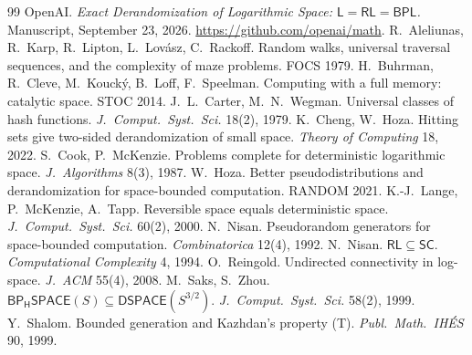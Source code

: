\documentclass[11pt]{article}
\theoremstyle{definition}
\theoremstyle{remark}
\begin{document}
\begin{thebibliography}{99}\small
{} OpenAI. \emph{Exact Derandomization of Logarithmic Space: $\mathsf L=\mathsf{RL}=\mathsf{BPL}$.} Manuscript, September 23, 2026. \url{https://github.com/openai/math}.
 R.~Aleliunas, R.~Karp, R.~Lipton, L.~Lov\'asz, C.~Rackoff. Random walks, universal traversal sequences, and the complexity of maze problems. FOCS 1979.
 H.~Buhrman, R.~Cleve, M.~Kouck\'y, B.~Loff, F.~Speelman. Computing with a full memory: catalytic space. STOC 2014.
 J.~L.~Carter, M.~N.~Wegman. Universal classes of hash functions. \emph{J.\ Comput.\ Syst.\ Sci.} 18(2), 1979.
 K.~Cheng, W.~Hoza. Hitting sets give two-sided derandomization of small space. \emph{Theory of Computing} 18, 2022.
 S.~Cook, P.~McKenzie. Problems complete for deterministic logarithmic space. \emph{J.\ Algorithms} 8(3), 1987.
 W.~Hoza. Better pseudodistributions and derandomization for space-bounded computation. RANDOM 2021.
 K.-J.~Lange, P.~McKenzie, A.~Tapp. Reversible space equals deterministic space. \emph{J.\ Comput.\ Syst.\ Sci.} 60(2), 2000.
 N.~Nisan. Pseudorandom generators for space-bounded computation. \emph{Combinatorica} 12(4), 1992.
 N.~Nisan. $\mathsf{RL}\subseteq\mathsf{SC}$. \emph{Computational Complexity} 4, 1994.
 O.~Reingold. Undirected connectivity in log-space. \emph{J.\ ACM} 55(4), 2008.
 M.~Saks, S.~Zhou. $\mathsf{BP_HSPACE}(S)\subseteq\mathsf{DSPACE}(S^{3/2})$. \emph{J.\ Comput.\ Syst.\ Sci.} 58(2), 1999.
 Y.~Shalom. Bounded generation and Kazhdan's property (T). \emph{Publ.\ Math.\ IH\'ES} 90, 1999.
\end{thebibliography}
\end{document}
